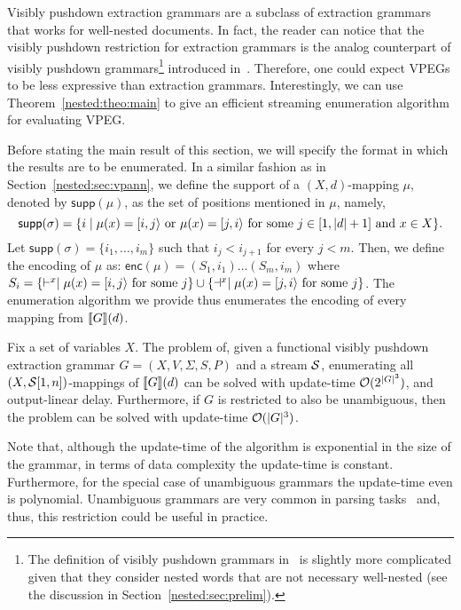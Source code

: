 Visibly pushdown extraction grammars are a subclass of extraction grammars that works for well-nested documents. In fact, the reader can notice that the visibly pushdown restriction for extraction grammars is the analog counterpart of visibly pushdown grammars\footnote{The definition of visibly pushdown grammars in~\cite{AlurM04} is slightly more complicated given that they consider nested words that are not necessary well-nested (see the discussion in Section~\ref{nested:sec:prelim}).} introduced in~\cite{AlurM04}. Therefore, one could expect VPEGs to be less expressive than extraction grammars. 
Interestingly, we can use Theorem~\ref{nested:theo:main} to give an efficient streaming enumeration algorithm for evaluating VPEG. 

Before stating the main result of this section, we will specify the format in which the results are to be enumerated. In a similar fashion as in Section~\ref{nested:sec:vpann}, we define the support of a $(X, d)$-mapping $\mu$, denoted by $\textsf{supp}(\mu)$, as the set of positions mentioned in $\mu$, namely, 
\[
\textsf{supp}(\sigma) = \{i \mid \mu(x) = [i,j\rangle \text{ or } \mu(x) = [j,i\rangle\text{ for some }j\in[1,|d|+1]\text{ and }x\in X\}.
\] 
Let $\textsf{supp}(\sigma) = \{i_1,\ldots, i_m\}$ such that $i_j < i_{j+1}$ for every $j < m$. 
Then, we define the encoding of $\mu$ as:
$
\textsf{enc}(\mu) = (S_1, i_1)\ldots (S_m, i_m)
$
where $S_i = \{\vdash^{x}\mid\mu(x) = [i,j\rangle\text{ for some }j\}\cup \{\dashv^{x}\mid\mu(x) = [j,i\rangle\text{ for some }j\}$.
The enumeration algorithm we provide thus enumerates the encoding of every mapping from ${\llbracket{G}\rrbracket}(d)$.

\begin{theorem}\label{nested:theo:spanners}
	Fix a set of variables $X$. The problem of, given a functional visibly pushdown extraction grammar $G = (X, V, \Sigma, S, P)$ and a stream $\mathcal{S}$, enumerating all $(X,\mathcal{S}[1,n])$-mappings of ${\llbracket{G}\rrbracket}(d)$ can be solved with update-time $\mathcal{O}(2^{|G|^3})$, and output-linear delay. Furthermore, if $G$ is restricted to also be unambiguous, then the problem can be solved with update-time $\mathcal{O}(|G|^3)$.
\end{theorem} 



Note that, although the update-time of the algorithm is exponential in the size of the grammar, in terms of data complexity the update-time is constant. Furthermore, for the special case of unambiguous grammars the update-time even is polynomial. Unambiguous grammars are very common in parsing tasks~\cite{aho1986compilers} and, thus, this restriction could be useful in practice. 



